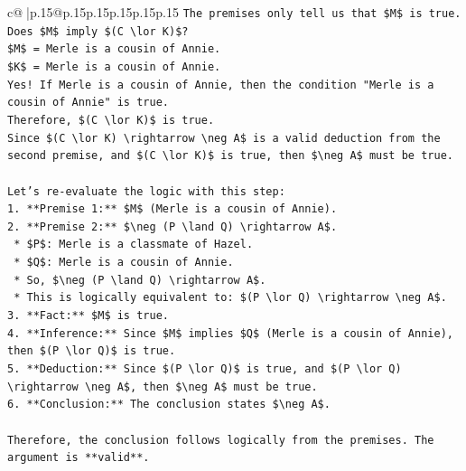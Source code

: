 \documentclass{article}
\begin{document}
{\begin{supertabular}{c@{$\;$}|p{.15\linewidth}@{}p{.15\linewidth}p{.15\linewidth}p{.15\linewidth}p{.15\linewidth}p{.15\linewidth}}
{{{\texttt{The premises only tell us that \$M\$ is true.} \\
\texttt{Does \$M\$ imply \$(C \textbackslash{}lor K)\$?} \\
\texttt{\$M\$ = Merle is a cousin of Annie.} \\
\texttt{\$K\$ = Merle is a cousin of Annie.} \\
\texttt{Yes! If Merle is a cousin of Annie, then the condition "Merle is a cousin of Annie" is true.} \\
\texttt{Therefore, \$(C \textbackslash{}lor K)\$ is true.} \\
\texttt{Since \$(C \textbackslash{}lor K) \textbackslash{}rightarrow \textbackslash{}neg A\$ is a valid deduction from the second premise, and \$(C \textbackslash{}lor K)\$ is true, then \$\textbackslash{}neg A\$ must be true.} \\
\\ 
\texttt{Let's re{-}evaluate the logic with this step:} \\
\texttt{1.  **Premise 1:** \$M\$ (Merle is a cousin of Annie).} \\
\texttt{2.  **Premise 2:** \$\textbackslash{}neg (P \textbackslash{}land Q) \textbackslash{}rightarrow A\$.} \\
\texttt{    *   \$P\$: Merle is a classmate of Hazel.} \\
\texttt{    *   \$Q\$: Merle is a cousin of Annie.} \\
\texttt{    *   So, \$\textbackslash{}neg (P \textbackslash{}land Q) \textbackslash{}rightarrow A\$.} \\
\texttt{    *   This is logically equivalent to: \$(P \textbackslash{}lor Q) \textbackslash{}rightarrow \textbackslash{}neg A\$.} \\
\texttt{3.  **Fact:** \$M\$ is true.} \\
\texttt{4.  **Inference:** Since \$M\$ implies \$Q\$ (Merle is a cousin of Annie), then \$(P \textbackslash{}lor Q)\$ is true.} \\
\texttt{5.  **Deduction:** Since \$(P \textbackslash{}lor Q)\$ is true, and \$(P \textbackslash{}lor Q) \textbackslash{}rightarrow \textbackslash{}neg A\$, then \$\textbackslash{}neg A\$ must be true.} \\
\texttt{6.  **Conclusion:** The conclusion states \$\textbackslash{}neg A\$.} \\
\\ 
\texttt{Therefore, the conclusion follows logically from the premises. The argument is **valid**.} \\
}}}
\end{supertabular}}
\end{document}
